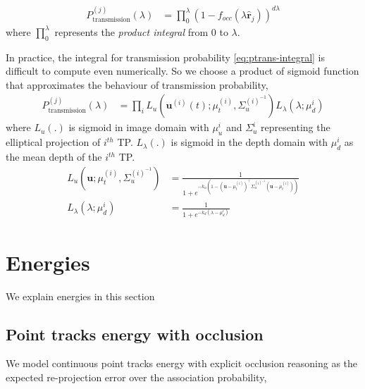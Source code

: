 \documentclass[10pt,twocolumn,letterpaper]{article}
\newcommand{\trackp}[1]{\mathbf{u}^{(i)}(#1)}
\newcommand{\occft}[1]{f_{occ}(#1)}
\newcommand{\ray}{\hat{\mathbf{r}}_j}
\newcommand{\Ptrans}{P^{(j)}_{\text{transmission}}(\lambda)}
\newcommand{\muiu}{\mu^{(i)}_t}
\newcommand{\Sigmaiu}{\Sigma^{(i)^{-1}}_u}
\begin{document}
\begin{align}
  \Ptrans &=
  \prod_{0}^{\lambda} (1 - \occft{\lambda \ray})^{d\lambda} %
  \label{eq:ptrans-integral}
\end{align}
where $\prod_{0}^{\lambda}$ represents the \emph{product integral} from $0$ to
$\lambda$. 

In practice, the integral for transmission probability
\eqref{eq:ptrans-integral} is difficult to compute even numerically. So we
choose a product of sigmoid function that approximates the behaviour of
transmission probability,
%
\begin{align}
\label{eq:evalCumulativePtrans}
  \Ptrans &= \prod_i L_u(\trackp{t}; \muiu,\Sigmaiu)L_{\lambda}(\lambda; \mu^i_d)
\end{align}
%
where $L_u(.)$ is sigmoid in image domain with $\mu^i_u$ and $\Sigma^i_u$
representing the elliptical projection of $i^{th}$ TP.
$L_{\lambda}(.)$ is sigmoid in the depth domain with $\mu^i_d$ as the mean
depth of the $i^{th}$ TP.
%
\begin{align}
  L_u(\mathbf{u}; \muiu,\Sigmaiu) &= \frac{1}{
    1 + e^{-k_u(1 - (\mathbf{u} - \muiu)^\top\Sigmaiu(\mathbf{u} -
    \muiu))}
  }
  \\
  L_{\lambda}(\lambda; \mu^i_d) &= \frac{1}{
    1 + e^{-k_d(\lambda - \mu^i_d)}
}
\end{align}
%

%


\section{Energies}
We explain energies in this section

\subsection{Point tracks energy with occlusion}
\label{sec:totalContPtTracksEnergy}
We model continuous point tracks energy with explicit occlusion reasoning as
the expected re-projection error over the association probability,
\end{document}
